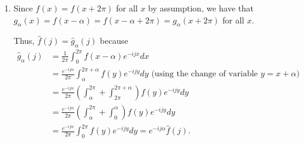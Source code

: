 \documentclass[a4paper,12pt]{article}
\begin{document}
\begin{enumerate}
    \item
        Since $f(x) = f(x + 2\pi)$ for all $x$ by assumption, we have that $g_\alpha(x) = f(x - \alpha) = f(x - \alpha + 2\pi) = g_\alpha(x + 2\pi)$ for all $x$. \par
        Thus, $\hat{f}(j) = \hat{g}_\alpha(j)$ because
        \begin{align*}
            \hat{g}_\alpha(j) &= \frac{1}{2\pi} \int_0^{2\pi} f(x - \alpha) e^{-ijx} dx \\
            &= \frac{e^{-ij\alpha}}{2\pi} \int_\alpha^{2\pi + \alpha} f(y) e^{-ijy} dy \text{ (using the change of variable $y = x + \alpha$)} \\
            &= \frac{e^{-ij\alpha}}{2\pi} \left( \int_\alpha^{2\pi} + \int_{2\pi}^{2\pi+\alpha} \right) f(y) e^{-ijy} dy \\
            &= \frac{e^{-ij\alpha}}{2\pi} \left( \int_\alpha^{2\pi} + \int_0^{\alpha} \right) f(y) e^{-ijy} dy \\
            &= \frac{e^{-ij\alpha}}{2\pi} \int_0^{2\pi} f(y) e^{-ijy} dy = e^{-ij\alpha} \hat{f}(j).
        \end{align*}


\end{enumerate}
\end{document}
